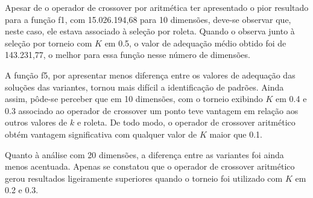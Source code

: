 Apesar de o operador de \gls{crossover} por aritmética ter apresentado o pior resultado para a função \gls{f1}, com 15.026.194,68 para 10 dimensões, deve-se observar que, neste caso, ele estava associado à seleção por roleta.
Quando o observa junto à seleção por torneio com \( K \) em 0.5, o valor de adequação médio obtido foi de 143.231,77, o melhor para essa função nesse número de dimensões.

A função \gls{f5}, por apresentar menos diferença entre os valores de adequação das soluções das variantes, tornou mais difícil a identificação de padrões.
Ainda assim, pôde-se perceber que em 10 dimensões, com o torneio exibindo \( K \) em 0.4 e 0.3 associado ao operador de \gls{crossover} um ponto teve vantagem em relação aos outros valores de \( k \) e roleta.
De todo modo, o operador de \gls{crossover} aritmético obtém vantagem significativa com qualquer valor de \( K \) maior que 0.1.

Quanto à análise com 20 dimensões, a diferença entre as variantes foi ainda menos acentuada.
Apenas se constatou que o operador de \gls{crossover} aritmético gerou resultados ligeiramente superiores quando o torneio foi utilizado com \( K \) em 0.2 e 0.3.